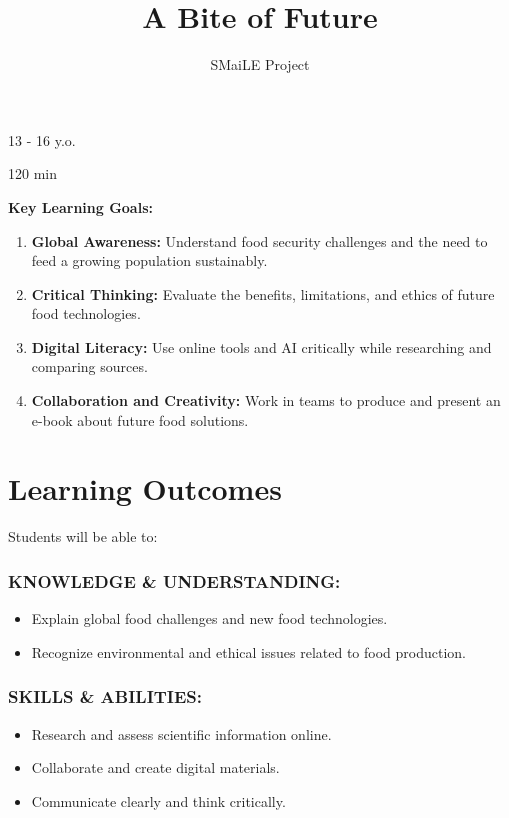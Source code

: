 \documentclass[11pt, a4paper]{article}
\begin{document}
\title{\textbf{\color{SmaileGreen}A Bite of Future}}
\author{SMaiLE Project}
\date{}
\maketitle
\thispagestyle{plain}

\begin{keyinfobox}
    \begin{description}[leftmargin=*, labelindent=0pt]
        \item[\bfseries\color{SmaileGreen} Target Group:] 13 - 16 y.o.
        \item[\bfseries\color{SmaileGreen} Duration:] 120 min
    \end{description}
    \textbf{Key Learning Goals:}
    \begin{enumerate}
        \item \textbf{Global Awareness:} Understand food security challenges and the need to feed a growing population sustainably.
        \item \textbf{Critical Thinking:} Evaluate the benefits, limitations, and ethics of future food technologies.
        \item \textbf{Digital Literacy:} Use online tools and AI critically while researching and comparing sources.
        \item \textbf{Collaboration and Creativity:} Work in teams to produce and present an e-book about future food solutions.
    \end{enumerate}
\end{keyinfobox}

\section*{Learning Outcomes}
Students will be able to:

\subsubsection*{KNOWLEDGE \& UNDERSTANDING:}
\begin{itemize}
    \item Explain global food challenges and new food technologies.
    \item Recognize environmental and ethical issues related to food production.
\end{itemize}

\subsubsection*{SKILLS \& ABILITIES:}
\begin{itemize}
    \item Research and assess scientific information online.
    \item Collaborate and create digital materials.
    \item Communicate clearly and think critically.
\end{itemize}
\end{document}
